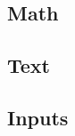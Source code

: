 \graphicspath{{sec03/images/}{sec03/code/}}
\lstset{inputpath=sec03/code}

\subsection{Math}




\subsection{Text}



\subsection{Inputs}

